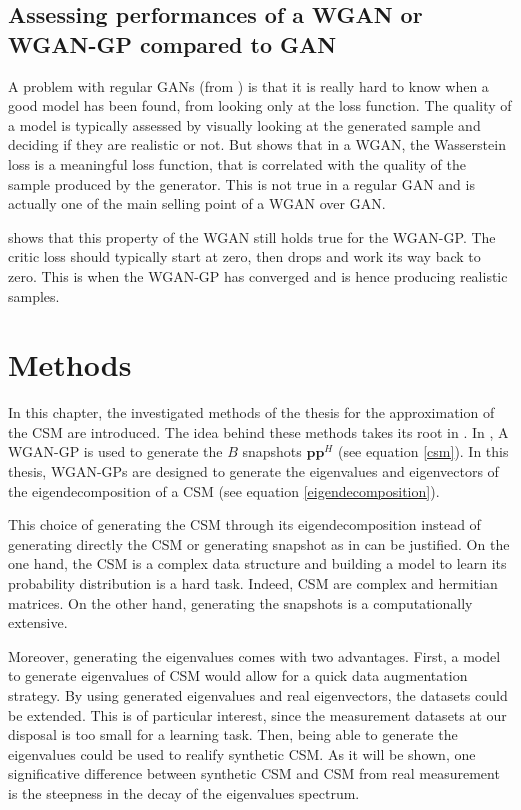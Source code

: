\documentclass[11pt,a4paper,twoside]{report}
\begin{document}
\section{Assessing performances of a WGAN or WGAN-GP compared to GAN} \label{sec:assessing_perf}

A problem with regular GANs (from \cite{goodfellow2020generative}) is that it is really hard to know when a good model has been found, from looking only at the loss function. The quality of a model is typically assessed by visually looking at the generated sample and deciding if they are realistic or not. But \cite{arjovsky2017wasserstein} shows that in a WGAN, the Wasserstein loss is a meaningful loss function, that is correlated with the quality of the sample produced by the generator. This is not true in a regular GAN and is actually one of the main selling point of a WGAN over GAN.

\cite{DBLP:journals/corr/GulrajaniAADC17} shows that this property of the WGAN still holds true for the WGAN-GP. The critic loss should typically start at zero, then drops and work its way back to zero. This is when the WGAN-GP has converged and is hence producing realistic samples.

\chapter{Methods}

In this chapter, the investigated methods of the thesis for the approximation of the CSM are introduced. The idea behind these methods takes its root in \cite{gerstoft2020parametric}. In \cite{gerstoft2020parametric}, A WGAN-GP is used to generate the $B$ snapshots $\mathbf{p} \mathbf{p}^H$ (see equation \ref{csm}). In this thesis, WGAN-GPs are designed to generate the eigenvalues and eigenvectors of the eigendecomposition of a CSM (see equation \ref{eigendecomposition}).

This choice of generating the CSM through its eigendecomposition instead of generating directly the CSM or generating snapshot as in \cite{gerstoft2020parametric} can be justified. On the one hand, the CSM is a complex data structure and building a model to learn its probability distribution is a hard task. Indeed, CSM are complex and hermitian matrices. On the other hand, generating the snapshots is a computationally extensive.

Moreover, generating the eigenvalues comes with two advantages. First, a model to generate eigenvalues of CSM would allow for a quick data augmentation strategy. By using generated eigenvalues and real eigenvectors, the datasets could be extended. This is of particular interest, since the measurement datasets at our disposal is too small for a learning task. Then, being able to generate the eigenvalues could be used to realify synthetic CSM. As it will be shown, one significative difference between synthetic CSM and CSM from real measurement is the steepness in the decay of the eigenvalues spectrum.
\end{document}
